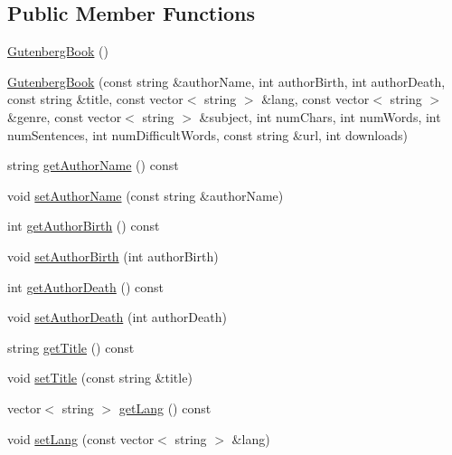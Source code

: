 \subsection*{Public Member Functions}
\begin{DoxyCompactItemize}
\item 
\hyperlink{classbridges_1_1dataset_1_1_gutenberg_book_ab88639acb3d28345f1db063d603f1123}{Gutenberg\+Book} ()
\item 
\hyperlink{classbridges_1_1dataset_1_1_gutenberg_book_abe1720623c08625c3e8760830d6c1aa0}{Gutenberg\+Book} (const string \&author\+Name, int author\+Birth, int author\+Death, const string \&title, const vector$<$ string $>$ \&lang, const vector$<$ string $>$ \&genre, const vector$<$ string $>$ \&subject, int num\+Chars, int num\+Words, int num\+Sentences, int num\+Difficult\+Words, const string \&url, int downloads)
\item 
string \hyperlink{classbridges_1_1dataset_1_1_gutenberg_book_af5d7264fa6bacf1e22e32597b56cf9ba}{get\+Author\+Name} () const
\item 
void \hyperlink{classbridges_1_1dataset_1_1_gutenberg_book_a09215f3b16398ecd44601d02783a3d31}{set\+Author\+Name} (const string \&author\+Name)
\item 
int \hyperlink{classbridges_1_1dataset_1_1_gutenberg_book_af79cc9c9e3ef58bf3a46f9b1f463ff21}{get\+Author\+Birth} () const
\item 
void \hyperlink{classbridges_1_1dataset_1_1_gutenberg_book_a3e1f467ffdd47e558d4b4f4c83f2e620}{set\+Author\+Birth} (int author\+Birth)
\item 
int \hyperlink{classbridges_1_1dataset_1_1_gutenberg_book_a658fe236dd9a6f8da0ce7bf6c074c144}{get\+Author\+Death} () const
\item 
void \hyperlink{classbridges_1_1dataset_1_1_gutenberg_book_a938d0e579e5d2b2c0c62a6ea22317223}{set\+Author\+Death} (int author\+Death)
\item 
string \hyperlink{classbridges_1_1dataset_1_1_gutenberg_book_a40fe78ea917df1212d1918da4dcfeb7a}{get\+Title} () const
\item 
void \hyperlink{classbridges_1_1dataset_1_1_gutenberg_book_a92b2299297a63bb95cb32edb236c29cd}{set\+Title} (const string \&title)
\item 
vector$<$ string $>$ \hyperlink{classbridges_1_1dataset_1_1_gutenberg_book_a6e131887b78b9741f410cd022e11af19}{get\+Lang} () const
\item 
void \hyperlink{classbridges_1_1dataset_1_1_gutenberg_book_aef718f3309b4959b04b7f8cc3e8f887e}{set\+Lang} (const vector$<$ string $>$ \&lang)

\end{DoxyCompactItemize}
